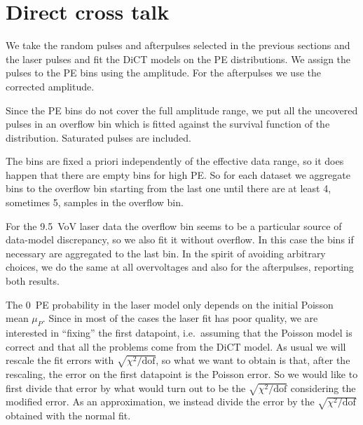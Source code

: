 \begin{figure}
    
    
    
\end{figure}

\section{Direct cross talk}

We take the random pulses and afterpulses selected in the previous sections and
the laser pulses and fit the DiCT models on the PE distributions. We assign the
pulses to the PE bins using the amplitude. For the afterpulses we use the
corrected amplitude.

Since the PE bins do not cover the full amplitude range, we put all the
uncovered pulses in an overflow bin which is fitted against the survival
function of the distribution. Saturated pulses are included.

The bins are fixed a priori independently of the effective data range, so it
does happen that there are empty bins for high PE. So for each dataset we
aggregate bins to the overflow bin starting from the last one until there are
at least 4, sometimes 5, samples in the overflow bin.

For the \SI{9.5}{VoV} laser data the overflow bin seems to be a particular
source of data-model discrepancy, so we also fit it without overflow. In this
case the bins if necessary are aggregated to the last bin. In the spirit of
avoiding arbitrary choices, we do the same at all overvoltages and also for the
afterpulses, reporting both results.

The 0~PE probability in the laser model only depends on the initial Poisson
mean $\mu_P$. Since in most of the cases the laser fit has poor quality, we are
interested in ``fixing'' the first datapoint, i.e.\ assuming that the Poisson
model is correct and that all the problems come from the DiCT model. As usual
we will rescale the fit errors with $\sqrt{\chi^2/\mathrm{dof}}$, so what we
want to obtain is that, after the rescaling, the error on the first datapoint
is the Poisson error. So we would like to first divide that error by what would
turn out to be the $\sqrt{\chi^2/\mathrm{dof}}$ considering the modified error.
As an approximation, we instead divide the error by the
$\sqrt{\chi^2/\mathrm{dof}}$ obtained with the normal fit.

